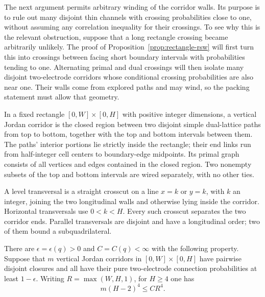 The next argument permits arbitrary winding of the corridor walls.
Its purpose is to rule out many disjoint thin
channels with crossing probabilities close to one,
without assuming any correlation inequality for their crossings.
To see why this is the relevant obstruction, suppose that a long
rectangle crossing became arbitrarily unlikely. The proof of
Proposition~\ref{prop:rectangle-rsw} will first turn this into
crossings between facing short boundary intervals with probabilities
tending to one.
Alternating primal and dual crossings will then isolate many disjoint
two-electrode corridors whose conditional crossing probabilities are
also near one. Their walls come from explored paths and may wind, so
the packing statement must allow that geometry.

\begin{definition}
\label{rect:corridor-definition}
In a fixed rectangle $[0,W]\times[0,H]$ with positive integer dimensions,
a vertical Jordan corridor is
the closed region between two disjoint simple dual-lattice paths from
top to bottom, together with the top and bottom intervals between them.
The paths' interior portions lie strictly inside the rectangle; their
end links run from half-integer cell centers to boundary-edge midpoints.
Its primal graph consists of all vertices and edges contained in the
closed region.  Two nonempty subsets of the top and bottom intervals
are wired separately, with no other ties.

A level transversal is a straight crosscut on a line $x=k$ or $y=k$,
with $k$ an integer, joining the two longitudinal walls and otherwise
lying inside the corridor.  Horizontal transversals use $0<k<H$.
Every such crosscut separates the two corridor ends.  Parallel
transversals are disjoint and have a longitudinal order; two of them
bound a subquadrilateral.
\end{definition}

\begin{lemma}
\label{rect:packing}
There are $\epsilon=\epsilon(q)>0$ and $C=C(q)<\infty$ with the
following property.  Suppose that $m$ vertical Jordan corridors in
$[0,W]\times[0,H]$ have pairwise disjoint closures and all have their
pure two-electrode connection probabilities at least $1-\epsilon$.
Writing $R=\max(W,H,1)$, for $H\ge4$ one has
\begin{equation}
 m(H-2)^4\le CR^4.
 \label{rect:packing-bound}
\end{equation}
\end{lemma}

